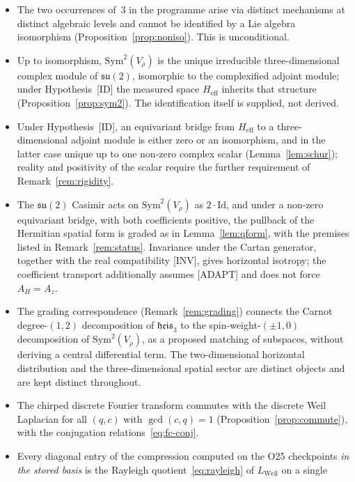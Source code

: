 \documentclass[11pt,a4paper]{article}
\newcommand{\Heff}{H_{\mathrm{eff}}}
\newcommand{\su}{\mathfrak{su}}
\newcommand{\heis}{\mathfrak{heis}_3}
\newcommand{\Vr}{V_\rho}
\newcommand{\Sym}{\mathrm{Sym}}
\begin{document}
    \begin{itemize}
      \item The two occurrences of~$3$ in the programme arise via distinct mechanisms at distinct
      algebraic levels and cannot be identified by a Lie algebra isomorphism
      (Proposition~\ref{prop:noniso}). This is unconditional.
      \item Up to isomorphism, $\Sym^2(\Vr)$ is the unique irreducible three-dimensional complex
      module of $\su(2)$, isomorphic to the complexified adjoint module; under
      Hypothesis~[ID] the measured space $\Heff$ inherits that structure
      (Proposition~\ref{prop:sym2}). The identification itself is supplied, not derived.
      \item Under Hypothesis~[ID], an equivariant bridge from $\Heff$ to a three-dimensional
      adjoint module is either zero or an isomorphism, and in the latter case unique up to one
      non-zero complex scalar (Lemma~\ref{lem:schur}); reality and positivity of the scalar require
      the further requirement of Remark~\ref{rem:rigidity}.
      \item The $\su(2)$ Casimir acts on $\Sym^2(\Vr)$ as $2\cdot\mathrm{Id}$, and under a non-zero
      equivariant bridge, with both coefficients positive, the pullback of the Hermitian spatial
      form is graded as in Lemma~\ref{lem:qform}, with the premises listed in
      Remark~\ref{rem:status}. Invariance under the Cartan
      generator, together with the real compatibility [INV], gives horizontal isotropy;
      the coefficient transport additionally assumes [ADAPT] and does not force $A_H=A_z$.
      \item The grading correspondence (Remark~\ref{rem:grading}) connects the Carnot degree-$(1,2)$
      decomposition of $\heis$ to the spin-weight-$(\pm 1, 0)$ decomposition of $\Sym^2(\Vr)$,
      as a proposed matching of subspaces, without deriving a central differential term. The two-dimensional
      horizontal distribution and the three-dimensional spatial sector are distinct objects and are
      kept distinct throughout.
      \item The chirped discrete Fourier transform commutes with the discrete Weil Laplacian for
      all $(q,c)$ with $\gcd(c,q) = 1$ (Proposition~\ref{prop:commute}), with the conjugation
      relations~\eqref{eq:fc-conj}.
      \item Every diagonal entry of the compression computed on the O25 checkpoints \emph{in the stored
      basis} is the Rayleigh quotient~\eqref{eq:rayleigh} of $L_{\mathrm{Weil}}$ on a single

\end{itemize}
\end{document}
